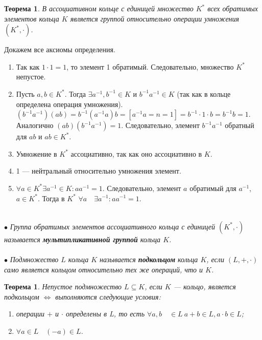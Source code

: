 \newtheorem*{7_5_1}{Теорема}\begin{7_5_1}
	В ассоциативном кольце с единицей множество $K^*$
	всех обратимых элементов кольца $K$
	является группой относительно операции умножения $(K^*, \cdot)$. 
\end{7_5_1}\begin{Proof}
	Докажем все аксиомы определения.\begin{enumerate}
		\item Так как $1\cdot 1 = 1$, то элемент 1 обратимый. Следовательно, множество $K^*$ непустое.
		\item Пусть $a,b\in K^*$. Тогда $\exists a^{-1}, b^{-1} \in K$ и $b^{-1}a^{-1}\in K$ (так как в кольце определена операция умножения).\\
		$(b^{-1}a^{-1})(ab) = b^{-1}(a^{-1}a)b = [a^{-1}a = n = 1] = b^{-1}\cdot 1\cdot b = b^{-1}b = 1$. Аналогично $(ab)(b^{-1}a^{-1}) = 1$. Следовательно, элемент $b^{-1}a^{-1}$ обратный для $ab$ и $ab\in K^*$.
		\item Умножение в $K^*$ ассоциативно, так как оно ассоциативно в $K$.
		\item 1 --- нейтральный относительно умножения элемент.
		\item $\forall a \in K^* \exists a^{-1}\in K : aa^{-1} = 1$. Следовательно, элемент $a$ обратимый для $a^{-1}$, $a \in K^*$. Тогда в $K^*$ $\forall a\quad \exists a^{-1} : aa^{-1} = 1$.
	\end{enumerate}
\end{Proof}\\
$\bullet$ \textit{Группа обратимых элементов ассоциативного кольца с единицей $(K^*, \cdot )$ называется
	\textbf{мультипликативной группой} кольца $K$.}\\\\
$\bullet$\textit{ Подмножество $L$ кольца $K$ называется \textbf{подкольцом} кольца $K$, если $(L, +, \cdot )$ само
	является кольцом относительно тех же операций, что и $K$.}
\newtheorem*{7_5_2}{Теорема}\begin{7_5_2}
	Непустое подмножество $L\subseteq K$, если $K$ --- кольцо, является подкольцом $\Longleftrightarrow$ выполняются следующие условия:\begin{enumerate}
		\item операции $+$ и $\cdot$ определены в L, то есть $\forall a,b\quad \in L\ a+b \in L, a\cdot b \in L$;
		\item $\forall a \in L\quad (-a) \in L$.
	\end{enumerate}
\end{7_5_2}
